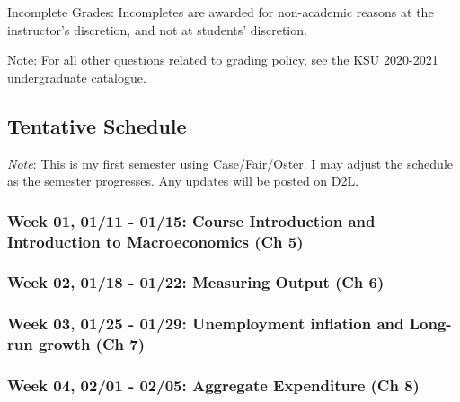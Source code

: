 \documentclass[11pt,]{article}
\begin{document}
Incomplete Grades: Incompletes are awarded for non-academic reasons at the instructor's discretion, and
not at students' discretion.

Note: For all other questions related to grading policy, see the KSU 2020-2021 undergraduate catalogue.
\newpage

\hypertarget{tentative-schedule}{%
\subsection*{Tentative Schedule}\label{tentative-schedule}}

\emph{Note}: This is my first semester using Case/Fair/Oster. I may adjust the schedule as the semester progresses. Any updates will be posted on D2L.

\hypertarget{week-01-0111---0115-course-introduction-and-introduction-to-macroeconomics-ch-5}{%
\subsubsection*{Week 01, 01/11 - 01/15: Course Introduction and Introduction to Macroeconomics (Ch 5)}\label{week-01-0111---0115-course-introduction-and-introduction-to-macroeconomics-ch-5}}

\hypertarget{week-02-0118---0122-measuring-output-ch-6}{%
\subsubsection*{Week 02, 01/18 - 01/22: Measuring Output (Ch 6)}\label{week-02-0118---0122-measuring-output-ch-6}}

\hypertarget{week-03-0125---0129-unemployment-inflation-and-long-run-growth-ch-7}{%
\subsubsection*{Week 03, 01/25 - 01/29: Unemployment inflation and Long-run growth (Ch 7)}\label{week-03-0125---0129-unemployment-inflation-and-long-run-growth-ch-7}}

\hypertarget{week-04-0201---0205-aggregate-expenditure-ch-8}{%
\subsubsection*{Week 04, 02/01 - 02/05: Aggregate Expenditure (Ch 8)}\label{week-04-0201---0205-aggregate-expenditure-ch-8}}
\end{document}
